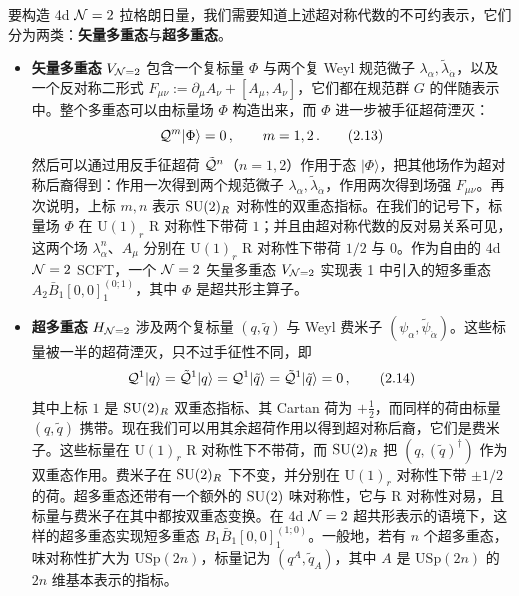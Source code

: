 要构造 4d $\mathcal{N}=2$ 拉格朗日量，我们需要知道上述超对称代数的不可约表示，它们分为两类：\textbf{矢量多重态}与\textbf{超多重态}。
\begin{itemize}
\item \textbf{矢量多重态} $V_{\mathcal{N}=2}$ 包含一个复标量 $\Phi$ 与两个复 Weyl 规范微子 $\lambda_\alpha,\tilde\lambda_{\dot\alpha}$，以及一个反对称二形式 $F_{\mu\nu}:=\partial_\mu A_\nu+[A_\mu,A_\nu]$，它们都在规范群 $G$ 的伴随表示中。整个多重态可以由标量场 $\Phi$ 构造出来，而 $\Phi$ 进一步被手征超荷湮灭：
\begin{equation}
  \mathcal{Q}^m|\Phi\rangle=0\,,\qquad m=1,2\,.
  \tag{2.13}
\end{equation}
然后可以通过用反手征超荷 $\tilde{\mathcal{Q}}^n$（$n=1,2$）作用于态 $|\Phi\rangle$，把其他场作为超对称后裔得到：作用一次得到两个规范微子 $\lambda_\alpha,\tilde\lambda_{\dot\alpha}$，作用两次得到场强 $F_{\mu\nu}$。再次说明，上标 $m,n$ 表示 $\mathrm{SU}(2)_R$ 对称性的双重态指标。在我们的记号下，标量场 $\Phi$ 在 $\mathrm{U}(1)_r$ R 对称性下带荷 $1$；并且由超对称代数的反对易关系可见，这两个场 $\lambda^n_\alpha$、$A_\mu$ 分别在 $\mathrm{U}(1)_r$ R 对称性下带荷 $1/2$ 与 $0$。作为自由的 4d $\mathcal{N}=2$ SCFT，一个 $\mathcal{N}=2$ 矢量多重态 $V_{\mathcal{N}=2}$ 实现表 1 中引入的短多重态 $A_2\bar B_1[0,0]^{(0;1)}_1$，其中 $\Phi$ 是超共形主算子。
\item \textbf{超多重态} $H_{\mathcal{N}=2}$ 涉及两个复标量 $(q,\tilde q)$ 与 Weyl 费米子 $(\psi_\alpha,\tilde\psi_{\dot\alpha})$。这些标量被一半的超荷湮灭，只不过手征性不同，即
\begin{equation}
  \mathcal{Q}^1|q\rangle=\tilde{\mathcal{Q}}^1|q\rangle=\mathcal{Q}^1|\tilde q\rangle=\tilde{\mathcal{Q}}^1|\tilde q\rangle=0\,,
  \tag{2.14}
\end{equation}
其中上标 $1$ 是 $\mathrm{SU}(2)_R$ 双重态指标、其 Cartan 荷为 $+\frac12$，而同样的荷由标量 $(q,\tilde q)$ 携带。现在我们可以用其余超荷作用以得到超对称后裔，它们是费米子。这些标量在 $\mathrm{U}(1)_r$ R 对称性下不带荷，而 $\mathrm{SU}(2)_R$ 把 $(q,(\tilde q)^\dagger)$ 作为双重态作用。费米子在 $\mathrm{SU}(2)_R$ 下不变，并分别在 $\mathrm{U}(1)_r$ 对称性下带 $\pm1/2$ 的荷。超多重态还带有一个额外的 $\mathrm{SU}(2)$ 味对称性，它与 R 对称性对易，且标量与费米子在其中都按双重态变换。在 4d $\mathcal{N}=2$ 超共形表示的语境下，这样的超多重态实现短多重态 $B_1\bar B_1[0,0]^{(1;0)}_1$。一般地，若有 $n$ 个超多重态，味对称性扩大为 $\mathrm{USp}(2n)$，标量记为 $(q^A,\tilde q_A)$，其中 $A$ 是 $\mathrm{USp}(2n)$ 的 $2n$ 维基本表示的指标。
\end{itemize}

